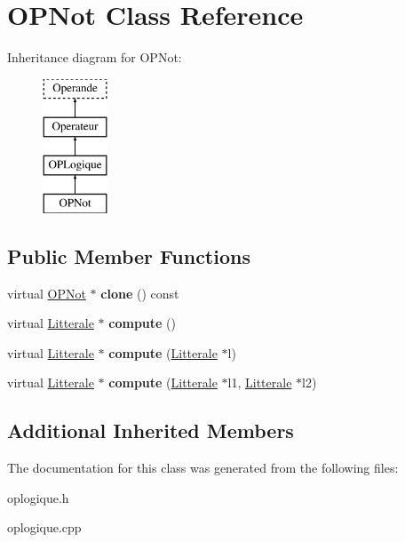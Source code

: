 \hypertarget{class_o_p_not}{}\section{O\+P\+Not Class Reference}
\label{class_o_p_not}
Inheritance diagram for O\+P\+Not\+:\begin{figure}[H]
\begin{center}
\leavevmode
\includegraphics[height=4.000000cm]{class_o_p_not}
\end{center}
\end{figure}
\subsection*{Public Member Functions}
\begin{DoxyCompactItemize}
\item 
virtual \hyperlink{class_o_p_not}{O\+P\+Not} $\ast$ {\bfseries clone} () const \hypertarget{class_o_p_not_afb5934b18a041d14d96d40f16082e291}{}\label{class_o_p_not_afb5934b18a041d14d96d40f16082e291}

\item 
virtual \hyperlink{class_litterale}{Litterale} $\ast$ {\bfseries compute} ()\hypertarget{class_o_p_not_ac530d751ef848207c958a304f54af04c}{}\label{class_o_p_not_ac530d751ef848207c958a304f54af04c}

\item 
virtual \hyperlink{class_litterale}{Litterale} $\ast$ {\bfseries compute} (\hyperlink{class_litterale}{Litterale} $\ast$l)\hypertarget{class_o_p_not_a1e3513845f524579b14f8f9989e4c9fb}{}\label{class_o_p_not_a1e3513845f524579b14f8f9989e4c9fb}

\item 
virtual \hyperlink{class_litterale}{Litterale} $\ast$ {\bfseries compute} (\hyperlink{class_litterale}{Litterale} $\ast$l1, \hyperlink{class_litterale}{Litterale} $\ast$l2)\hypertarget{class_o_p_not_a11202c69a1cfce9e0bce813248e6e37b}{}\label{class_o_p_not_a11202c69a1cfce9e0bce813248e6e37b}

\end{DoxyCompactItemize}
\subsection*{Additional Inherited Members}


The documentation for this class was generated from the following files\+:\begin{DoxyCompactItemize}
\item 
oplogique.\+h\item 
oplogique.\+cpp\end{DoxyCompactItemize}

